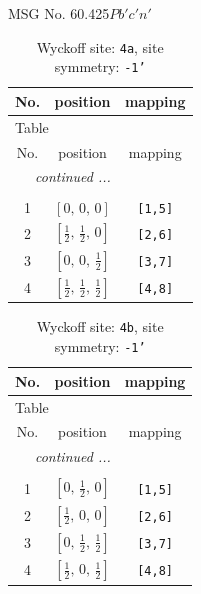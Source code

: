 \documentclass[fleqn,8pt]{jsarticle}
\begin{document}
\setcounter{MaxMatrixCols}{32}

\renewcommand{\tablename}{Table~}
\renewcommand{\figurename}{Figure~}
\begin{center}
\LARGE
MSG No. 60.425\quad$Pb'c'n'$
\end{center}
\renewcommand{\arraystretch}{1.2}
\begin{longtable}{ccc}
\caption{Wyckoff site: {\tt 4a}, site symmetry: {\tt -1'}}
 \\
 \hline \hline
No. & position & mapping \\ \hline \endfirsthead

\multicolumn{2}{l}{\tablename\ \thetable{}} \\
 \hline \hline
No. & position & mapping \\ \hline \endhead

 \hline \hline
\multicolumn{2}{r}{\footnotesize\it continued ...} \\ \endfoot

 \hline \hline
\multicolumn{2}{r}{} \\ \endlastfoot

1 & $\left[ 0,\, 0,\, 0 \right]$ & {\tt [1,5]} \\ \hline
2 & $\left[ \frac{1}{2},\, \frac{1}{2},\, 0 \right]$ & {\tt [2,6]} \\ \hline
3 & $\left[ 0,\, 0,\, \frac{1}{2} \right]$ & {\tt [3,7]} \\ \hline
4 & $\left[ \frac{1}{2},\, \frac{1}{2},\, \frac{1}{2} \right]$ & {\tt [4,8]} \\
\end{longtable}
\renewcommand{\arraystretch}{1.2}
\begin{longtable}{ccc}
\caption{Wyckoff site: {\tt 4b}, site symmetry: {\tt -1'}}
 \\
 \hline \hline
No. & position & mapping \\ \hline \endfirsthead

\multicolumn{2}{l}{\tablename\ \thetable{}} \\
 \hline \hline
No. & position & mapping \\ \hline \endhead

 \hline \hline
\multicolumn{2}{r}{\footnotesize\it continued ...} \\ \endfoot

 \hline \hline
\multicolumn{2}{r}{} \\ \endlastfoot

1 & $\left[ 0,\, \frac{1}{2},\, 0 \right]$ & {\tt [1,5]} \\ \hline
2 & $\left[ \frac{1}{2},\, 0,\, 0 \right]$ & {\tt [2,6]} \\ \hline
3 & $\left[ 0,\, \frac{1}{2},\, \frac{1}{2} \right]$ & {\tt [3,7]} \\ \hline
4 & $\left[ \frac{1}{2},\, 0,\, \frac{1}{2} \right]$ & {\tt [4,8]} \\
\end{longtable}
\end{document}
